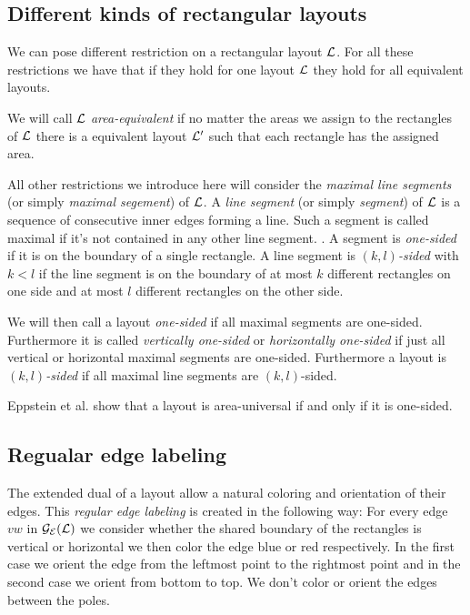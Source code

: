 \subsection{Different kinds of rectangular layouts}
  We can pose different restriction on a rectangular layout $\mathcal{L}$. For all these restrictions we have that if they hold for one layout $\mathcal{L}$ they hold for all equivalent layouts.

  We will call $\mathcal{L}$ \emph{area-equivalent} if no matter the areas we assign to the rectangles of $\mathcal{L}$ there is a equivalent layout $\mathcal{L}'$ such that each rectangle has the assigned area.

  All other restrictions we introduce here will consider the \emph{maximal line segments} (or simply \emph{maximal segement}) of $\mathcal{L}$. A \emph{line segment} (or simply \emph{segment}) of $\mathcal{L}$ is a sequence of consecutive inner edges forming a line. Such a segment is called maximal if it's not contained in any other line segment. . A segment is \emph{one-sided} if it is on the boundary of a single rectangle. A line segment is \emph{$(k,l)$-sided} with $k<l$ if the line segment is on the boundary of at most $k$ different rectangles on one side and at most $l$ different rectangles on the other side.

  We will then call a layout \emph{one-sided} if all maximal segments are one-sided. Furthermore it is called \emph{vertically one-sided} or \emph{horizontally one-sided} if just all vertical or horizontal maximal segments are one-sided. Furthermore a layout is \emph{$(k,l)$-sided} if all maximal line segments are $(k,l)$-sided.

  Eppstein et al. \cite{Eppstein2012} show that a layout is area-universal if and only if it is one-sided.


\subsection{Regualar edge labeling}
  The extended dual of a layout allow a natural coloring and orientation of their edges. This \emph{regular edge labeling} is created in the following way:
  For every edge $vw$ in $\mathcal{G}_{\mathcal{E}}(\mathcal{L})$ we consider whether the shared boundary of the rectangles is vertical or horizontal we then color the edge blue or red respectively. In the first case we orient the edge from the  leftmost point to the rightmost point and in the second case we orient from bottom to top. We don't color or orient the edges between the poles.

